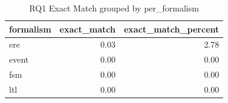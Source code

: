 \begin{table}
\caption{RQ1 Exact Match grouped by per_formalism}
\label{tab:rq1_per_formalism}
\begin{tabular}{lrr}
\toprule
formalism & exact_match & exact_match_percent \\
\midrule
ere & 0.03 & 2.78 \\
event & 0.00 & 0.00 \\
fsm & 0.00 & 0.00 \\
ltl & 0.00 & 0.00 \\
\bottomrule
\end{tabular}
\end{table}
